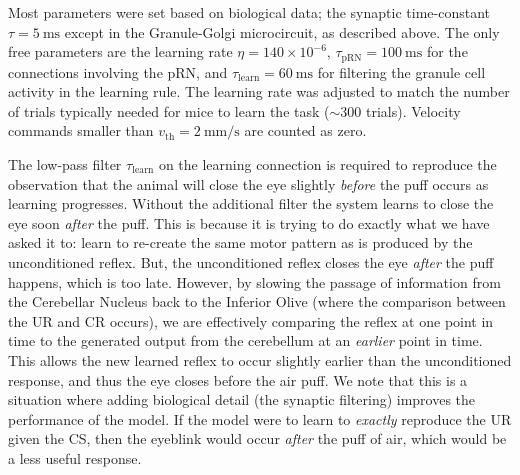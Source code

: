 Most parameters were set based on biological data; the synaptic time-constant $\tau = \SI{5}{\milli\second}$ except in the Granule-Golgi microcircuit, as described above.
The only free parameters are the learning rate $\eta=140\times 10^{-6}$, $\tau_\mathrm{pRN} = \SI{100}{\milli\second}$ for the connections involving the pRN, and $\tau_\mathrm{learn} = \SI{60}{\milli\second}$ for filtering the granule cell activity in the learning rule.
The learning rate was adjusted to match the number of trials typically needed for mice to learn the task ($\sim 300$ trials).
Velocity commands smaller than $v_\mathrm{th} = \SI{2}{\milli\metre\per\second}$ are counted as zero.

The low-pass filter $\tau_\mathrm{learn}$ on the learning connection is required to reproduce the observation that the animal will close the eye slightly \emph{before} the puff occurs as learning progresses.
Without the additional filter the system learns to close the eye soon \emph{after} the puff.  This is because it is trying to do exactly what we have asked it to: learn to re-create the same motor pattern as is produced by the unconditioned reflex.  But, the unconditioned reflex closes the eye \emph{after} the puff happens, which is too late.  However, by slowing the passage of information from the Cerebellar Nucleus back to the Inferior Olive (where the comparison between the UR and CR occurs), we are effectively comparing the reflex at one point in time to the generated output from the cerebellum at an \emph{earlier} point in time.  This allows the new learned reflex to occur slightly earlier than the unconditioned response, and thus the eye closes before the air puff.  We note that this is a situation where adding biological detail (the synaptic filtering) improves the performance of the model.  If the model were to learn to \textit{exactly} reproduce the UR given the CS, then the eyeblink would occur \textit{after} the puff of air, which would be a less useful response.

